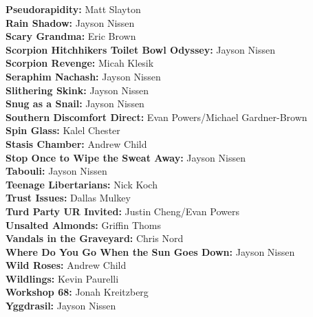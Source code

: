 \begin{flushleft}
\textbf{Pseudorapidity:} Matt Slayton\\
\textbf{Rain Shadow:} Jayson Nissen\\
\textbf{Scary Grandma:} Eric Brown\\
\textbf{Scorpion Hitchhikers Toilet Bowl Odyssey:} Jayson Nissen\\
\textbf{Scorpion Revenge:} Micah Klesik\\
\textbf{Seraphim Nachash:} Jayson Nissen\\
\textbf{Slithering Skink:} Jayson Nissen\\
\textbf{Snug as a Snail:} Jayson Nissen\\
\textbf{Southern Discomfort Direct:} Evan Powers/Michael Gardner-Brown\\
\textbf{Spin Glass:} Kalel Chester\\
\textbf{Stasis Chamber:} Andrew Child\\
\textbf{Stop Once to Wipe the Sweat Away:} Jayson Nissen\\
\textbf{Tabouli:} Jayson Nissen\\
\textbf{Teenage Libertarians:} Nick Koch\\
\textbf{Trust Issues:} Dallas Mulkey\\
\textbf{Turd Party UR Invited:} Justin Cheng/Evan Powers\\
\textbf{Unsalted Almonds:} Griffin Thoms\\
\textbf{Vandals in the Graveyard:} Chris Nord\\
\textbf{Where Do You Go When the Sun Goes Down:} Jayson Nissen\\
\textbf{Wild Roses:} Andrew Child\\
\textbf{Wildlings:} Kevin Paurelli\\
\textbf{Workshop 68:} Jonah Kreitzberg\\
\textbf{Yggdrasil:} Jayson Nissen\\
\end{flushleft}
\onecolumn
\clearpage